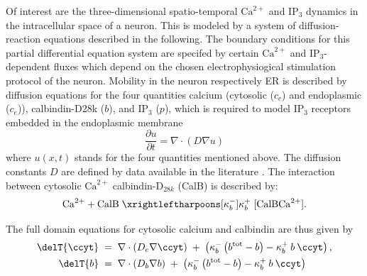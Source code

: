 Of interest are the three-dimensional spatio-temporal $\textrm{Ca}^{2+}$ and $\textrm{IP}_3$ dynamics in the intracellular space of a neuron.
This is modeled by a system of diffusion-reaction equations described in the following.
The boundary conditions for this partial differential equation system are specifed by certain $\textrm{Ca}^{2+}$ and $\textrm{IP}_3$-dependent fluxes which depend on the chosen electrophysiogical stimulation protocol of the neuron.
Mobility in the neuron respectively ER is described by diffusion equations for the four quantities calcium (cytosolic ($c_c$) and endoplasmic ($c_e$)), calbindin-D28k ($b$), and $\textrm{IP}_3$ ($p$), which is required to model $\textrm{IP}_3$ receptors embedded in the endoplasmic membrane
\begin{equation}
\frac{\partial u}{\partial t} = \nabla \cdot (D \nabla u)
\end{equation}
where $u(x, t)$ stands for the four quantities mentioned above.
The diffusion constants $D$ are defined by data available in the literature \cite{Allbritton1992, Schmidt2003}.
The interaction between cytosolic $\textrm{Ca}^{2+}$ calbindin-$\textrm{D}_{28k}$ (CalB) is described by:
\begin{align}
  \mathrm{Ca}^{2+}+\mathrm{CalB}\;\xrightleftharpoons
  [\kappa_{b}^{-}]{\kappa_{b}^{+}}\;[\mathrm{CalBCa}^{2+}].
\end{align}

\noindent The full domain equations for cytosolic calcium and calbindin are thus given by
\begin{align}
  \delT{\ccyt} & \;=\; \nabla \cdot \left( D_{c} \nabla \ccyt \right) \;+\;
    \left(\kappa_{b}^{-}\left(b^{\mathrm{tot}}-b\right)
        -\kappa_{b}^{+}\:b\:\ccyt\right), \label{eq:ccyt}\\
  \delT{b} & \;=\; \nabla \cdot \left( D_{b} \nabla b \right) \;+\;
    \left(\kappa_{b}^{-}\left(b^{\mathrm{tot}}-b\right)
        -\kappa_{b}^{+}\:b\:\ccyt\right)  \label{eq:buff}
\end{align}

